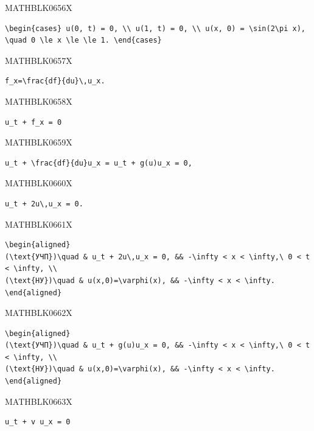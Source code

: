 \documentclass[
  ukrainian,
]{article}
\begin{document}
MATHBLK0656X

\begin{verbatim}
\begin{cases} u(0, t) = 0, \\ u(1, t) = 0, \\ u(x, 0) = \sin(2\pi x), \quad 0 \le x \le \le 1. \end{cases}
\end{verbatim}

MATHBLK0657X

\begin{verbatim}
f_x=\frac{df}{du}\,u_x.
\end{verbatim}

MATHBLK0658X

\begin{verbatim}
u_t + f_x = 0
\end{verbatim}

MATHBLK0659X

\begin{verbatim}
u_t + \frac{df}{du}u_x = u_t + g(u)u_x = 0,
\end{verbatim}

MATHBLK0660X

\begin{verbatim}
u_t + 2u\,u_x = 0.
\end{verbatim}

MATHBLK0661X

\begin{verbatim}
\begin{aligned}
(\text{УЧП})\quad & u_t + 2u\,u_x = 0, && -\infty < x < \infty,\ 0 < t < \infty, \\
(\text{НУ})\quad & u(x,0)=\varphi(x), && -\infty < x < \infty.
\end{aligned}
\end{verbatim}

MATHBLK0662X

\begin{verbatim}
\begin{aligned}
(\text{УЧП})\quad & u_t + g(u)u_x = 0, && -\infty < x < \infty,\ 0 < t < \infty, \\
(\text{НУ})\quad & u(x,0)=\varphi(x), && -\infty < x < \infty.
\end{aligned}
\end{verbatim}

MATHBLK0663X

\begin{verbatim}
u_t + v u_x = 0
\end{verbatim}
\end{document}

